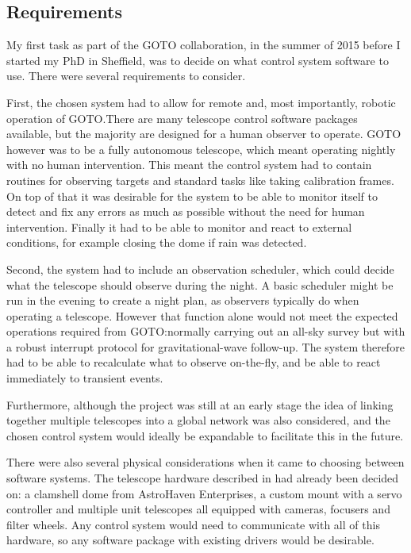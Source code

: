 \subsection{Requirements}
\label{sec:control_requirements}
\begin{colsection}

My first task as part of the GOTO collaboration, in the summer of 2015 before I started my PhD in Sheffield, was to decide on what control system software to use. There were several requirements to consider.

First, the chosen system had to allow for remote and, most importantly, robotic operation of GOTO.\@ There are many telescope control software packages available, but the majority are designed for a human observer to operate. GOTO however was to be a fully autonomous telescope, which meant operating nightly with no human intervention. This meant the control system had to contain routines for observing targets and standard tasks like taking calibration frames. On top of that it was desirable for the system to be able to monitor itself to detect and fix any errors as much as possible without the need for human intervention. Finally it had to be able to monitor and react to external conditions, for example closing the dome if rain was detected.

Second, the system had to include an observation scheduler, which could decide what the telescope should observe during the night. A basic scheduler might be run in the evening to create a night plan, as observers typically do when operating a telescope. However that function alone would not meet the expected operations required from GOTO:\@ normally carrying out an all-sky survey but with a robust interrupt protocol for gravitational-wave follow-up. The system therefore had to be able to recalculate what to observe on-the-fly, and be able to react immediately to transient  events.

Furthermore, although the project was still at an early stage the idea of linking together multiple telescopes into a global network was also considered, and the chosen control system would ideally be expandable to facilitate this in the future.

There were also several physical considerations when it came to choosing between software systems. The telescope hardware described in  had already been decided on: a clamshell dome from AstroHaven Enterprises, a custom mount with a  servo controller and multiple unit telescopes all equipped with  cameras, focusers and filter wheels. Any control system would need to communicate with all of this hardware, so any software package with existing drivers would be desirable.


\end{colsection}
